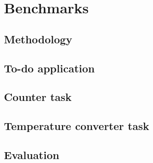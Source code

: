 \chapter{Benchmarks}
\label{chap:walktrough}




\section{Methodology}



\section{To-do application}
\section{Counter task}
\section{Temperature converter task}


\section{Evaluation}

